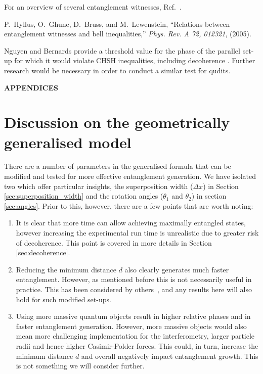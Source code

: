 \documentclass[%
 reprint,
 superscriptaddress,
 amsmath,
 amssymb,
 aps,
 longbibliography
]{revtex4-2}
\begin{document}
\begin{thebibliography}{10}
For an overview of several entanglement witnesses, Ref.~\cite {Guhne2009}.

P.~Hyllus, O.~Ghune, D.~Bruss, and M.~Lewenstein, ``Relations between
  entanglement witnesses and bell inequalities,'' {\em Phys. Rev. A 72,
  012321}, (2005).

Nguyen and Bernards provide a threshold value for the phase of the parallel
  set-up for which it would violate CHSH inequalities, including decoherence
  \cite {Nguyen2019}. Further research would be necessary in order to conduct a
  similar test for qudits.

\end{thebibliography}

\newpage

\begin{appendices}
\begin{center}
    \textbf{APPENDICES}
\end{center}
	
\section{Discussion on the geometrically generalised model \label{sec:discussgeneral}}

\indent There are a number of parameters in the generalised formula that can be modified and tested for more effective entanglement generation. We have isolated two which offer particular insights, the superposition width ($\Delta x$) in Section \ref{sec:superposition_width} and the rotation angles ($\theta_1$ and $\theta_2$) in section \ref{sec:angles}. Prior to this, however, there are a few points that are worth noting:\\
\begin{enumerate}
    \item It is clear that more time can allow achieving maximally entangled states, however increasing the experimental run time is unrealistic due to greater risk of decoherence. This point is covered in more details in Section \ref{sec:decoherence}.
    \item Reducing the minimum distance $d$ also clearly generates much faster entanglement. However, as mentioned before this is not necessarily useful in practice. This has been considered by others~\cite{Kamp2020}, and any results here will also hold for such modified set-ups.
    \item Using more massive quantum objects result in higher relative phases and in faster entanglement generation. However, more massive objects would also mean more challenging implementation for the interferometry, larger particle radii and hence higher Casimir-Polder forces. This could, in turn, increase the minimum distance $d$ and overall negatively impact entanglement growth. This is not something we will consider further.
\end{enumerate}


\end{appendices}
\end{document}
